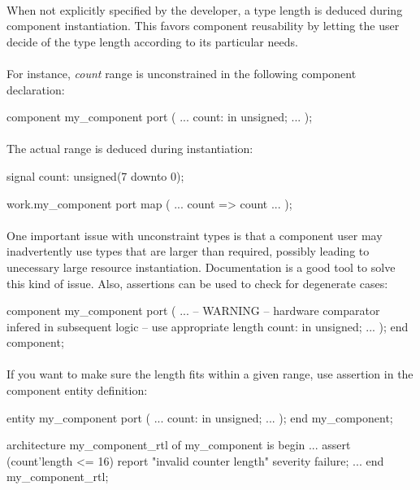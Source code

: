 \documentclass[12pt]{article}
\begin{document}
\newpage
\setcounter{tocdepth}{1}
\tableofcontents



\paragraph{}
When not explicitly specified by the developer, a type length
is deduced during component instantiation. This favors component
reusability by letting the user decide of the type length
according to its particular needs.

\paragraph{}
For instance, \textit{count} range is unconstrained in the
following component declaration:
\begin{vhdl}
component my_component
port
(
 ...
 count: in unsigned;
 ...
);
\end{vhdl}

\paragraph{}
The actual range is deduced during instantiation:
\begin{vhdl}
signal count: unsigned(7 downto 0);

work.my_component
port map
(
 ...
 count => count
 ...
);
\end{vhdl}

\paragraph{}
One important issue with unconstraint types is that a component
user may inadvertently use types that are larger than required,
possibly leading to unecessary large resource instantiation.
Documentation is a good tool to solve this kind of issue. Also,
assertions can be used to check for degenerate cases:
\begin{vhdl}
component my_component
port
(
 ...
 -- WARNING
 -- hardware comparator infered in subsequent logic
 -- use appropriate length
 count: in unsigned;
 ...
);
end component;
\end{vhdl}

\paragraph{}
If you want to make sure the length fits within a given range,
use assertion in the component entity definition:
\begin{vhdl}
entity my_component
port
(
 ...
 count: in unsigned;
 ...
);
end my_component;

architecture my_component_rtl of my_component is
begin
...
assert (count'length <= 16)
report "invalid counter length"
severity failure;
...
end my_component_rtl;
\end{vhdl}
\end{document}
